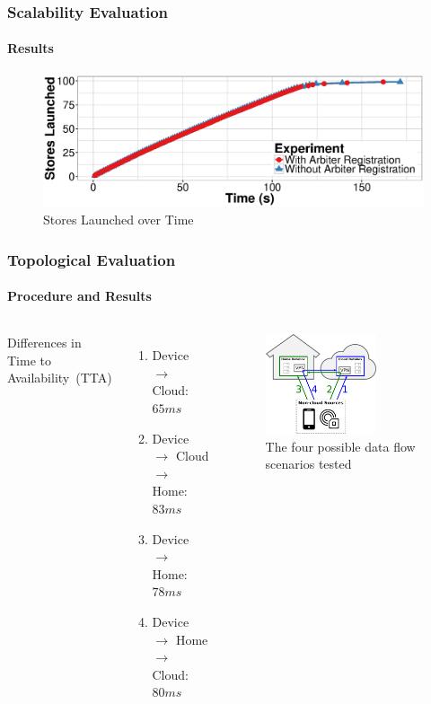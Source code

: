 \documentclass[aspectratio=169]{beamer}
\begin{document}
\begin{frame}
	\frametitle{Scalability Evaluation}
	\framesubtitle{Results}

	\begin{figure}
		\centering
		\includegraphics[width=\linewidth]{arbiter}
		\caption{Stores Launched over Time}
	\end{figure}
\end{frame}

\begin{frame}
	\frametitle{Topological Evaluation}
	\framesubtitle{Procedure and Results}

	\begin{columns}[c]
		Differences in Time to Availability~(TTA)
		\begin{enumerate}
			\item Device $\rightarrow$ Cloud:\\{$65ms$}
			\item Device $\rightarrow$ Cloud $\rightarrow$ Home:\\{$83ms$}
			\item Device $\rightarrow$ Home:\\{$78ms$}
			\item Device $\rightarrow$ Home $\rightarrow$ Cloud:\\{$80ms$}
		\end{enumerate}
		\begin{figure}
			\centering
			\includegraphics[width=0.7\textwidth]{scenarios}
			\caption{The four possible data flow scenarios tested}
		\end{figure}
	\end{columns}
\end{frame}
\end{document}
